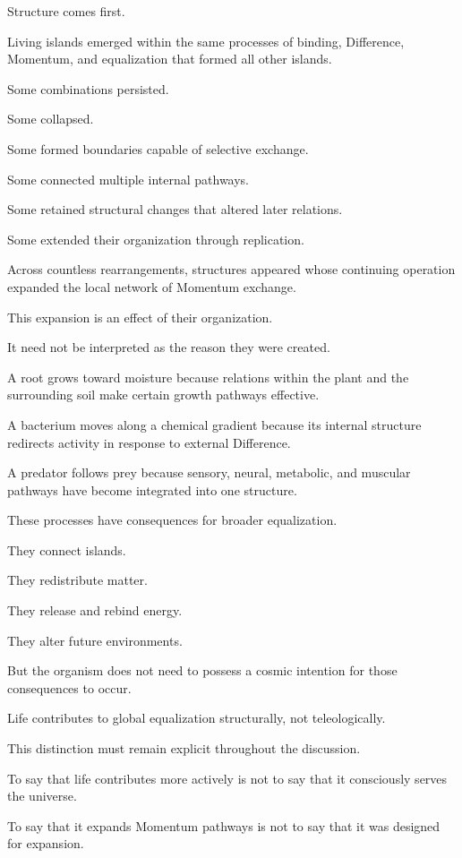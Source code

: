 Structure comes first.

Living islands emerged within the same processes of binding, Difference, Momentum, and equalization that formed all other islands.

Some combinations persisted.

Some collapsed.

Some formed boundaries capable of selective exchange.

Some connected multiple internal pathways.

Some retained structural changes that altered later relations.

Some extended their organization through replication.

Across countless rearrangements, structures appeared whose continuing operation expanded the local network of Momentum exchange.

This expansion is an effect of their organization.

It need not be interpreted as the reason they were created.

A root grows toward moisture because relations within the plant and the surrounding soil make certain growth pathways effective.

A bacterium moves along a chemical gradient because its internal structure redirects activity in response to external Difference.

A predator follows prey because sensory, neural, metabolic, and muscular pathways have become integrated into one structure.

These processes have consequences for broader equalization.

They connect islands.

They redistribute matter.

They release and rebind energy.

They alter future environments.

But the organism does not need to possess a cosmic intention for those consequences to occur.

Life contributes to global equalization structurally, not teleologically.

This distinction must remain explicit throughout the discussion.

To say that life contributes more actively is not to say that it consciously serves the universe.

To say that it expands Momentum pathways is not to say that it was designed for expansion.

